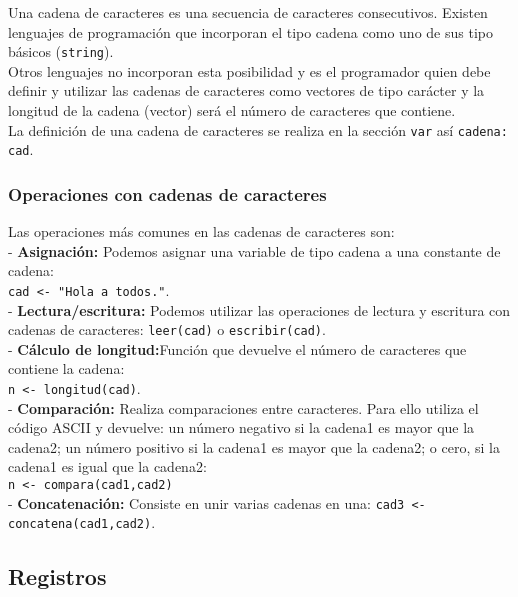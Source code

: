 \documentclass[12pt,letterpaper]{article}
\begin{document}
Una cadena de caracteres es una secuencia de caracteres consecutivos. Existen lenguajes de programación que incorporan el tipo cadena como uno de sus tipo básicos (\texttt{string}).\\
Otros lenguajes no incorporan esta posibilidad y es el programador quien debe definir y utilizar las cadenas de caracteres como vectores de tipo carácter y la longitud de la cadena (vector) será el número de caracteres que contiene.\\
La definición de una cadena de caracteres se realiza en la sección \texttt{var} así \texttt{cadena: cad}.

\subsubsection{Operaciones con cadenas de caracteres}

Las operaciones más comunes en las cadenas de caracteres son:\\
- \textbf{Asignación:} Podemos asignar una variable de tipo cadena a una constante de cadena:\\ \texttt{cad <- "Hola a todos."}.\\
- \textbf{Lectura/escritura:} Podemos utilizar las operaciones de lectura y escritura con cadenas de caracteres: \texttt{leer(cad)} o \texttt{escribir(cad)}.\\
- \textbf{Cálculo de longitud:}Función que devuelve el número de caracteres que contiene la cadena:\\ \texttt{n <- longitud(cad)}.\\
- \textbf{Comparación:} Realiza comparaciones entre caracteres. Para ello utiliza el código ASCII y devuelve: un número negativo si la cadena1 es mayor que la cadena2; un número positivo si la cadena1 es mayor que la cadena2; o cero, si la cadena1 es igual que la cadena2:\\
\texttt{n <- compara(cad1,cad2)}\\
- \textbf{Concatenación:} Consiste en unir varias cadenas en una: \texttt{cad3 <- concatena(cad1,cad2)}.

\subsection{Registros}
\end{document}
